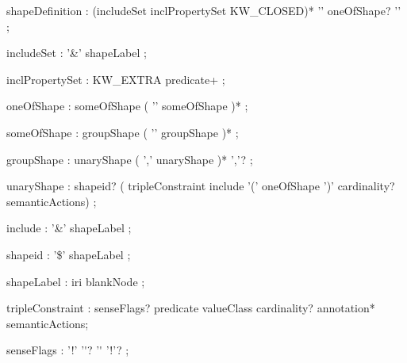 \documentclass{article}
\def\bnf#1{{\scriptsize {{#1}} }}
\begin{document}
\begin{framed}
\noindent
\bnf{shapeDefinition : (includeSet \textbar  inclPropertySet \textbar  KW\_CLOSED)* '{' oneOfShape? '}' ;}
\end{framed}


\begin{framed}
\noindent
\bnf{includeSet      : '\&' shapeLabel ;}
\end{framed}


\begin{framed}
\noindent
\bnf{inclPropertySet : KW\_EXTRA predicate+ ;}
\end{framed}


\begin{framed}
\noindent
\bnf{oneOfShape      : someOfShape ( '\textbar ' someOfShape )* ;}
\end{framed}


\begin{framed}
\noindent
\bnf{someOfShape     : groupShape ( '\textbar \textbar ' groupShape )* ;}
\end{framed}


\begin{framed}
\noindent
\bnf{groupShape      : unaryShape ( ',' unaryShape )* ','? ;}
\end{framed}


\begin{framed}
\noindent
\bnf{unaryShape      : shapeid? ( tripleConstraint \textbar  include \textbar  '(' oneOfShape ')' cardinality? semanticActions) ;}
\end{framed}


\begin{framed}
\noindent
\bnf{include         : '\&' shapeLabel ;}
\end{framed}


\begin{framed}
\noindent
\bnf{shapeid         : '\$' shapeLabel ;}
\end{framed}


\begin{framed}
\noindent
\bnf{shapeLabel      : iri \textbar  blankNode ;}
\end{framed}


\begin{framed}
\noindent
\bnf{tripleConstraint : senseFlags? predicate valueClass cardinality? annotation* semanticActions;}
\end{framed}


\begin{framed}
\noindent
\bnf{senseFlags      : '!' '\textrm'? \textbar  '\textrm' '!'? ;}
\end{framed}
\end{document}
